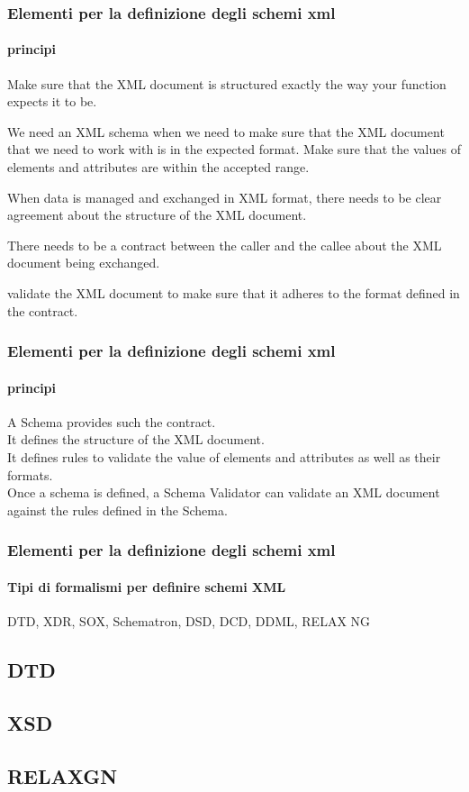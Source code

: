 \begin{frame}
    \frametitle{Elementi per la definizione degli schemi xml}
    \framesubtitle{principi}
    \addtocounter{nframe}{1}

    Make sure that the XML document is structured exactly the way your function expects it to be.

   We need an XML schema when we need to make sure that the XML document that we need to work with is in the expected format.
   Make sure that the values of elements and attributes are within the accepted range.

   When data is managed and exchanged in XML format, there needs to be clear agreement about the structure of the XML document.

   There needs to be a contract between the caller and the callee about the XML document being exchanged.

   validate the XML document to make sure that it adheres to the format defined in the contract.


\end{frame}



\begin{frame}
    \frametitle{Elementi per la definizione degli schemi xml}
    \framesubtitle{principi}
    \addtocounter{nframe}{1}

    A Schema provides such the contract. 
    \\ It defines the structure of the XML document. 
    \\ It defines rules to validate the value of elements and attributes as well as their formats. 
    \\ Once a schema is defined, a Schema Validator can validate an XML document against the rules defined in the Schema.


\end{frame}


\begin{frame}
    \frametitle{Elementi per la definizione degli schemi xml}
    \framesubtitle{Tipi di formalismi per definire schemi XML}
    \addtocounter{nframe}{1}

   DTD, XDR, SOX, Schematron, DSD, DCD, DDML, RELAX NG

\end{frame}

\subsection{DTD}


\subsection{XSD}
%

\subsection{RELAXGN}
%